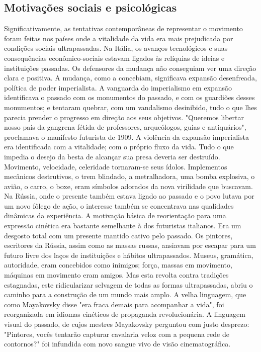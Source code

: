\documentclass[a4paper]{article}
\begin{document}
\subsection*{Motivações sociais e psicológicas}

Significativamente, as tentativas contemporâneas de representar o movimento foram feitas nos países onde a vitalidade da vida era mais prejudicada por condições sociais ultrapassadas. Na Itália, os avanços tecnológicos e suas consequências econômico-sociais estavam ligados às relíquias de ideias e instituições passadas. Os defensores da mudança não conseguiam ver uma direção clara e positiva. A mudança, como a concebiam, significava expansão desenfreada, política de poder imperialista. A vanguarda do imperialismo em expansão identificava o passado com os monumentos do passado, e com os guardiões desses monumentos; e tentaram quebrar, com um vandalismo desinibido, tudo o que lhes parecia prender o progresso em direção aos seus objetivos. "Queremos libertar nosso país da gangrena fétida de professores, arqueólogos, guias e antiquários", proclamava o manifesto futurista de 1909. A violência da expansão imperialista era identificada com a vitalidade; com o próprio fluxo da vida. Tudo o que impedia o desejo da besta de alcançar sua presa deveria ser destruído. Movimento, velocidade, celeridade tornaram-se seus ídolos. Implementos mecânicos destrutivos, o trem blindado, a metralhadora, uma bomba explosiva, o avião, o carro, o boxe, eram símbolos adorados da nova virilidade que buscavam. Na Rússia, onde o presente também estava ligado ao passado e o povo lutava por um novo fôlego de ação, o interesse também se concentrava nas qualidades dinâmicas da experiência. A motivação básica de reorientação para uma expressão cinética era bastante semelhante à dos futuristas italianos. Era um desgosto total com um presente mantido cativo pelo passado. Os pintores, escritores da Rússia, assim como as massas russas, ansiavam por escapar para um futuro livre dos laços de instituições e hábitos ultrapassados. Museus, gramática, autoridade, eram concebidos como inimigos; força, massas em movimento, máquinas em movimento eram amigos. Mas esta revolta contra tradições estagnadas, este ridicularizar selvagem de todas as formas ultrapassadas, abriu o caminho para a construção de um mundo mais amplo. A velha linguagem, que como Mayakovsky disse "era fraca demais para acompanhar a vida", foi reorganizada em idiomas cinéticos de propaganda revolucionária. A linguagem visual do passado, de cujos mestres Mayakovsky perguntou com justo desprezo: "Pintores, vocês tentarão capturar cavalaria veloz com a pequena rede de contornos?" foi infundida com novo sangue vivo de visão cinematográfica.
\end{document}
